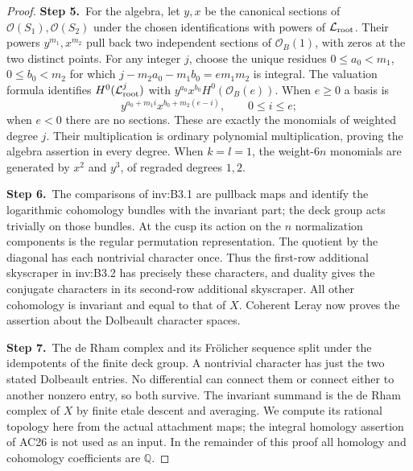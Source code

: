 \documentclass[11pt,a4paper]{article}
\theoremstyle{plain}
\theoremstyle{definition}
\begin{document}
\begin{proof}
\par\smallskip\noindent\textbf{Step 5.}\ For the algebra, let $y,x$ be the canonical sections of
$\mathcal O(S_1),\mathcal O(S_2)$ under the chosen identifications with powers of
$\mathcal L_{\rm root}$. Their powers $y^{m_1},x^{m_2}$ pull back two independent
sections of $\mathcal O_B(1)$, with zeros at the two distinct points.
For any integer $j$, choose the unique residues
$0\le a_0<m_1$, $0\le b_0<m_2$ for which
$j-m_2a_0-m_1b_0=e m_1m_2$ is integral.
The valuation formula identifies $H^0(\mathcal L_{\rm root}^j)$ with
$y^{a_0}x^{b_0}H^0(\mathcal O_B(e))$. When $e\ge0$ a basis is
\[
y^{a_0+m_1i}x^{b_0+m_2(e-i)},\qquad0\le i\le e;
\]
when $e<0$ there are no sections. These are exactly the monomials of
weighted degree $j$. Their multiplication is ordinary polynomial
multiplication, proving the algebra assertion in every degree.
When $k=l=1$, the weight-$6n$ monomials are generated by $x^2$ and
$y^3$, of regraded degrees $1,2$.

\par\smallskip\noindent\textbf{Step 6.}\ The comparisons of inv:B3.1 are pullback maps and identify the logarithmic
cohomology bundles with the invariant part; the deck group acts
trivially on those bundles. At the cusp its action on the $n$
normalization components is the regular permutation representation.
The quotient by the diagonal has each nontrivial character once.
Thus the first-row additional skyscraper in inv:B3.2 has precisely these
characters, and duality gives the conjugate characters in its
second-row additional skyscraper. All other cohomology is invariant
and equal to that of $X$. Coherent Leray now proves the assertion
about the Dolbeault character spaces.

\par\smallskip\noindent\textbf{Step 7.}\ The de Rham complex and its Fr\"olicher sequence split under the
idempotents of the finite deck group. A nontrivial character has just
the two stated Dolbeault entries. No differential can connect them
or connect either to another nonzero entry, so both survive.
The invariant summand is the de Rham complex of $X$ by finite
etale descent and averaging. We compute its rational topology here
from the actual attachment maps; the integral homology assertion
of AC26 is not used as an input. In the remainder of this proof
all homology and cohomology coefficients are $\mathbb Q$.


\end{proof}
\end{document}
